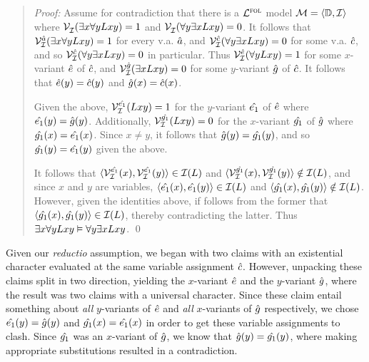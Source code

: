 \begin{quote}
\label{allmodels6}
  \textit{Proof:}
  Assume for contradiction that there is a $\mathcal{L}^{\textsc{fol}}$ model $\mathcal{M}=\langle\mathbb{D},\mathcal{I}\rangle$ where $\mathcal{V}_{\mathcal{I}}^{}(\exists x\forall yLxy)=1$ and $\mathcal{V}_{\mathcal{I}}^{}(\forall y\exists xLxy)=0$.
  It follows that $\mathcal{V}_{\mathcal{I}}^{\hat{a}}(\exists x\forall yLxy)=1$ for every v.a. $\hat{a}$, and $\mathcal{V}_{\mathcal{I}}^{\hat{c}}(\forall y\exists xLxy)=0$ for some v.a. $\hat{c}$, and so $\mathcal{V}_{\mathcal{I}}^{\hat{c}}(\forall y\exists xLxy)=0$ in particular.
  Thus $\mathcal{V}_{\mathcal{I}}^{\hat{e}}(\forall yLxy)=1$ for some $x$-variant $\hat{e}$ of $\hat{c}$, and $\mathcal{V}_{\mathcal{I}}^{\hat{g}}(\exists xLxy)=0$ for some $y$-variant $\hat{g}$ of $\hat{c}$.
  It follows that $\hat{e}(y)=\hat{c}(y)$ and $\hat{g}(x)=\hat{c}(x)$.

  Given the above, $\mathcal{V}_{\mathcal{I}}^{\hat{e_1}}(Lxy)=1$ for the $y$-variant $\hat{e_1}$ of $\hat{e}$ where $\hat{e_1}(y)=\hat{g}(y)$.
  Additionally, $\mathcal{V}_{\mathcal{I}}^{\hat{g_1}}(Lxy)=0$ for the $x$-variant $\hat{g_1}$ of $\hat{g}$ where $\hat{g_1}(x)=\hat{e_1}(x)$.
  Since $x\neq y$, it follows that $\hat{g}(y)=\hat{g_1}(y)$, and so $\hat{g_1}(y)=\hat{e_1}(y)$ given the above. 

  It follows that $\langle\mathcal{V}_{\mathcal{I}}^{\hat{e_1}}(x),\mathcal{V}_{\mathcal{I}}^{\hat{e_1}}(y)\rangle\in\mathcal{I}(L)$ and $\langle\mathcal{V}_{\mathcal{I}}^{\hat{g_1}}(x),\mathcal{V}_{\mathcal{I}}^{\hat{g_1}}(y)\rangle\notin\mathcal{I}(L)$, and since $x$ and $y$ are variables, $\langle\hat{e_1}(x),\hat{e_1}(y)\rangle\in\mathcal{I}(L)$ and $\langle\hat{g_1}(x),\hat{g_1}(y)\rangle\notin\mathcal{I}(L)$.
  However, given the identities above, if follows from the former that $\langle\hat{g_1}(x),\hat{g_1}(y)\rangle\in\mathcal{I}(L)$, thereby contradicting the latter.
  Thus $\exists x\forall yLxy \vDash \forall y\exists xLxy$.
  \qed
\end{quote}

Given our \textit{reductio} assumption, we began with two claims with an existential character evaluated at the same variable assignment $\hat{c}$.
However, unpacking these claims split in two direction, yielding the $x$-variant $\hat{e}$ and the $y$-variant $\hat{g}$, where the result was two claims with a universal character.
Since these claim entail something about \textit{all} $y$-variants of $\hat{e}$ and \textit{all} $x$-variants of $\hat{g}$ respectively, we chose $\hat{e_1}(y)=\hat{g}(y)$ and $\hat{g_1}(x)=\hat{e_1}(x)$ in order to get these variable assignments to clash. 
Since $\hat{g_1}$ was an $x$-variant of $\hat{g}$, we know that $\hat{g}(y)=\hat{g_1}(y)$, where making appropriate substitutions resulted in a contradiction.





